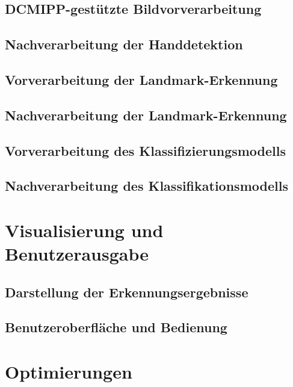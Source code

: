 \subsection{DCMIPP-gestützte Bildvorverarbeitung}
\subsection{Nachverarbeitung der Handdetektion}
\subsection{Vorverarbeitung der Landmark-Erkennung}
\subsection{Nachverarbeitung der Landmark-Erkennung}
\subsection{Vorverarbeitung des Klassifizierungsmodells}
\subsection{Nachverarbeitung des Klassifikationsmodells}

\section{Visualisierung und Benutzerausgabe}
\subsection{Darstellung der Erkennungsergebnisse}
\subsection{Benutzeroberfläche und Bedienung}

\section{Optimierungen}
